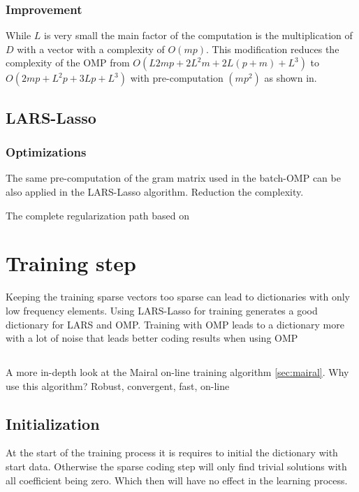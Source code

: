 \subsubsection*{Improvement}
While $L$ is very small the main factor of the computation is
the multiplication of $D$ with a vector with a complexity of $O(mp)$. 
This modification reduces the complexity of the OMP from $O\left(L2mp + 2L^2m + 2L(p+m) + L^3\right)$ to $O\left(2mp + L^2p + 3Lp + L^3\right)$ 
with pre-computation $\left(mp^2\right)$ as shown in\cite{Rubinstein2008}. 

\subsection{LARS-Lasso}
\subsubsection*{Optimizations}
The same pre-computation of the gram matrix used in the batch-OMP can be
also applied in the LARS-Lasso algorithm. Reduction the complexity. %

The complete regularization path based on\cite{Efron2004}


\section{Training step}
Keeping the training sparse vectors too sparse can lead to dictionaries with
only low frequency elements. Using LARS-Lasso for training generates a good
dictionary for LARS and OMP. Training with OMP leads to a dictionary more with a
lot of noise that leads better coding results when using OMP 

\subsection{\trainDL}
A more in-depth look at the Mairal on-line training algorithm \ref{sec:mairal}. 
Why use this algorithm? Robust, convergent, fast, on-line

\subsection{Initialization}
At the start of the training process it is requires to initial the
dictionary with start data. Otherwise the sparse coding step will only find
trivial solutions with all coefficient being zero. Which then will have no
effect in the learning process.

